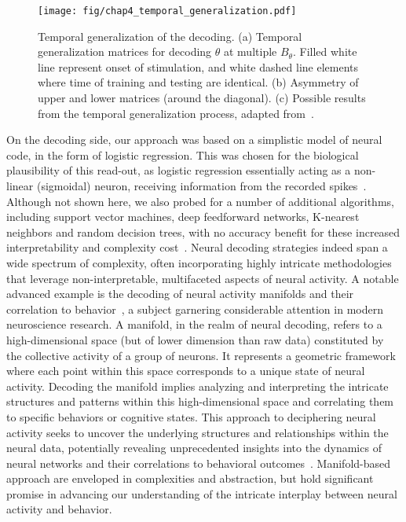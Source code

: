 \begin{figure}[h!tbp]
\vspace{0.1cm}
\centering
\texttt{[image: fig/chap4\_temporal\_generalization.pdf]}
\caption[Temporal generalization of the decoding.]{Temporal generalization of the decoding. (a) Temporal generalization matrices for decoding $\theta$ at multiple $B_\theta$. Filled white line represent onset of stimulation, and white dashed line elements where time of training and testing are identical. (b) Asymmetry of upper and lower matrices (around the diagonal). (c) Possible results from the temporal generalization process, adapted from~\cite{king2014characterizing}.}
\label{fig_chap4_temporal_generalization}
\end{figure} 

On the decoding side, our approach was based on a simplistic model of neural code, in the form of logistic regression. This was chosen for the biological plausibility of this read-out, as logistic regression essentially acting as a non-linear (sigmoidal) neuron, receiving information from the recorded spikes~\cite{berens2012fast}. Although not shown here, we also probed for a number of additional algorithms, including support vector machines, deep feedforward networks, K-nearest neighbors and random decision trees, with no accuracy benefit for these increased interpretability and complexity cost~\cite{glaser2020machine}.  
Neural decoding strategies indeed span a wide spectrum of complexity, often incorporating highly intricate methodologies that leverage non-interpretable, multifaceted aspects of neural activity. A notable advanced example is the decoding of neural activity manifolds and their correlation to behavior~\cite{chung2021neural}, a subject garnering considerable attention in modern neuroscience research. A manifold, in the realm of neural decoding, refers to a high-dimensional space (but of lower dimension than raw data) constituted by the collective activity of a group of neurons. It represents a geometric framework where each point within this space corresponds to a unique state of neural activity. Decoding the manifold implies analyzing and interpreting the intricate structures and patterns within this high-dimensional space and correlating them to specific behaviors or cognitive states. This approach to deciphering neural activity seeks to uncover the underlying structures and relationships within the neural data, potentially revealing unprecedented insights into the dynamics of neural networks and their correlations to behavioral outcomes~\cite{schneider2023learnable}. Manifold-based approach are enveloped in complexities and abstraction, but hold significant promise in advancing our understanding of the intricate interplay between neural activity and behavior.


